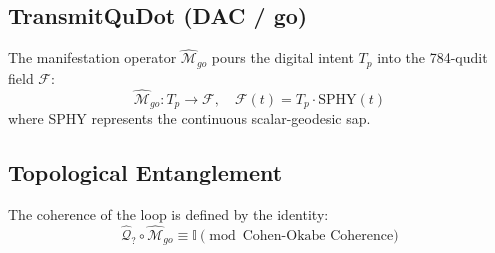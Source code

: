 \documentclass{article}
\begin{document}
\subsection{TransmitQuDot (DAC / go)}
The manifestation operator $\hat{\mathcal{M}}_{go}$ pours the digital intent $T_p$ into the 784-qudit field $\mathcal{F}$:
\begin{equation}
    \hat{\mathcal{M}}_{go} : T_p \to \mathcal{F}, \quad \mathcal{F}(t) = T_p \cdot \text{SPHY}(t)
\end{equation}
where SPHY represents the continuous scalar-geodesic sap.

\subsection{Topological Entanglement}
The coherence of the loop is defined by the identity:
\begin{equation}
    \hat{\mathcal{Q}}_{?} \circ \hat{\mathcal{M}}_{go} \equiv \mathbb{I} \pmod{\text{Cohen-Okabe Coherence}}
\end{equation}
\end{document}
